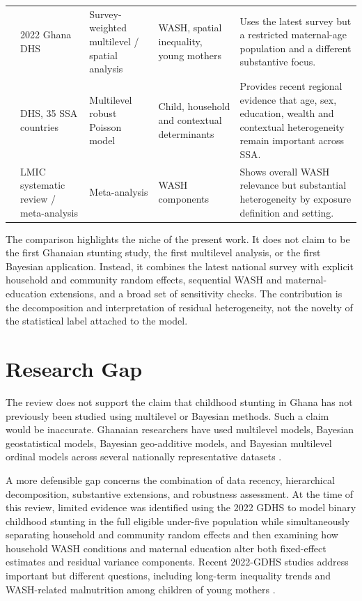 \begin{table}[H]
{\begin{tabular}{p{3.2cm}p{2.2cm}p{2.7cm}p{3.2cm}p{4.7cm}}
\citet{OgumEtAl2026} & 2022 Ghana DHS & Survey-weighted multilevel / spatial analysis & WASH, spatial inequality, young mothers & Uses the latest survey but a restricted maternal-age population and a different substantive focus. \\
\citet{MoloroEtAl2026} & DHS, 35 SSA countries & Multilevel robust Poisson model & Child, household and contextual determinants & Provides recent regional evidence that age, sex, education, wealth and contextual heterogeneity remain important across SSA. \\
\citet{WijayantoEtAl2026} & LMIC systematic review / meta-analysis & Meta-analysis & WASH components & Shows overall WASH relevance but substantial heterogeneity by exposure definition and setting. \\
\bottomrule
\end{tabular}%
}
\end{table}

The comparison highlights the niche of the present work. It does not claim to be the first Ghanaian stunting study, the first multilevel analysis, or the first Bayesian application. Instead, it combines the latest national survey with explicit household and community random effects, sequential WASH and maternal-education extensions, and a broad set of sensitivity checks. The contribution is the decomposition and interpretation of residual heterogeneity, not the novelty of the statistical label attached to the model.

\section{Research Gap}

The review does not support the claim that childhood stunting in Ghana has not previously been studied using multilevel or Bayesian methods. Such a claim would be inaccurate. Ghanaian researchers have used multilevel models, Bayesian geostatistical models, Bayesian geo-additive models, and Bayesian multilevel ordinal models across several nationally representative datasets \cite{AhetoEtAl2015,AhetoDagne2021,AmoakoJohnson2022,IddrisuGyabaah2023}.

A more defensible gap concerns the combination of data recency, hierarchical decomposition, substantive extensions, and robustness assessment. At the time of this review, limited evidence was identified using the 2022 GDHS to model binary childhood stunting in the full eligible under-five population while simultaneously separating household and community random effects and then examining how household WASH conditions and maternal education alter both fixed-effect estimates and residual variance components. Recent 2022-GDHS studies address important but different questions, including long-term inequality trends \cite{OsborneEtAl2025} and WASH-related malnutrition among children of young mothers \cite{OgumEtAl2026}.

